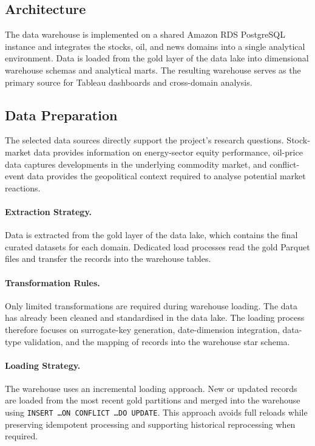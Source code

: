 \documentclass[11pt,a4paper]{article}
\begin{document}
\subsection{Architecture}
\label{sec:dw_architecture}

The data warehouse is implemented on a shared Amazon RDS PostgreSQL
instance and integrates the stocks, oil, and news domains into a
single analytical environment. Data is loaded from the gold layer of
the data lake into dimensional warehouse schemas and analytical marts.
The resulting warehouse serves as the primary source for Tableau
dashboards and cross-domain analysis.

\subsection{Data Preparation}
\label{sec:dw_data_prep}

The selected data sources directly support the project's research
questions. Stock-market data provides information on energy-sector
equity performance, oil-price data captures developments in the
underlying commodity market, and conflict-event data provides the
geopolitical context required to analyse potential market reactions.

\paragraph{Extraction Strategy.}
Data is extracted from the gold layer of the data lake, which contains
the final curated datasets for each domain. Dedicated load processes
read the gold Parquet files and transfer the records into the
warehouse tables.

\paragraph{Transformation Rules.}
Only limited transformations are required during warehouse loading.
The data has already been cleaned and standardised in the data lake.
The loading process therefore focuses on surrogate-key generation,
date-dimension integration, data-type validation, and the mapping of
records into the warehouse star schema.

\paragraph{Loading Strategy.}
The warehouse uses an incremental loading approach. New or updated
records are loaded from the most recent gold partitions and merged
into the warehouse using \texttt{INSERT \dots ON CONFLICT \dots DO
UPDATE}. This approach avoids full reloads while preserving
idempotent processing and supporting historical reprocessing when
required.
\end{document}
